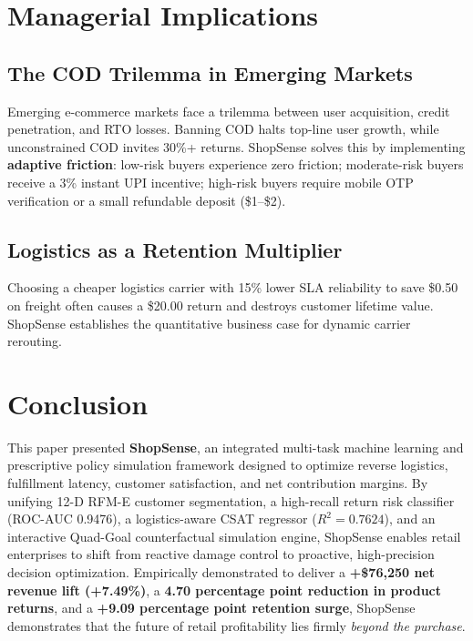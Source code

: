 \documentclass[conference]{IEEEtran}
\begin{document}
\section{Managerial Implications}
\subsection{The COD Trilemma in Emerging Markets}
Emerging e-commerce markets face a trilemma between user acquisition, credit penetration, and RTO losses. Banning COD halts top-line user growth, while unconstrained COD invites 30\%+ returns. ShopSense solves this by implementing \textbf{adaptive friction}: low-risk buyers experience zero friction; moderate-risk buyers receive a 3\% instant UPI incentive; high-risk buyers require mobile OTP verification or a small refundable deposit (\$1--\$2).

\subsection{Logistics as a Retention Multiplier}
Choosing a cheaper logistics carrier with 15\% lower SLA reliability to save \$0.50 on freight often causes a \$20.00 return and destroys customer lifetime value. ShopSense establishes the quantitative business case for dynamic carrier rerouting.

\section{Conclusion}
This paper presented \textbf{ShopSense}, an integrated multi-task machine learning and prescriptive policy simulation framework designed to optimize reverse logistics, fulfillment latency, customer satisfaction, and net contribution margins. By unifying 12-D RFM-E customer segmentation, a high-recall return risk classifier (ROC-AUC 0.9476), a logistics-aware CSAT regressor ($R^2 = 0.7624$), and an interactive Quad-Goal counterfactual simulation engine, ShopSense enables retail enterprises to shift from reactive damage control to proactive, high-precision decision optimization. Empirically demonstrated to deliver a \textbf{+\$76,250 net revenue lift (+7.49\%)}, a \textbf{4.70 percentage point reduction in product returns}, and a \textbf{+9.09 percentage point retention surge}, ShopSense demonstrates that the future of retail profitability lies firmly \textit{beyond the purchase}.
\end{document}
